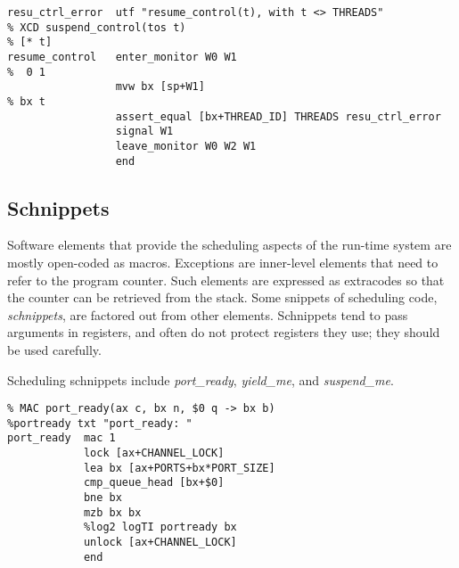 \begin{tabbing}
\indents
{}
\finmore
\end{tabbing}

{\small
\begin{verbatim}
resu_ctrl_error  utf "resume_control(t), with t <> THREADS"
% XCD suspend_control(tos t)                                          % [* t]
resume_control   enter_monitor W0 W1                                  %  0 1
                 mvw bx [sp+W1]                                       % bx t
                 assert_equal [bx+THREAD_ID] THREADS resu_ctrl_error
                 signal W1
                 leave_monitor W0 W2 W1
                 end
\end{verbatim}}

\begin{tabbing}
\indents
\finmon
\end{tabbing}



\subsection{Schnippets}
Software elements that provide the scheduling aspects of the run-time system are mostly open-coded as macros. Exceptions are inner-level elements that need to refer to the program counter. Such elements are expressed as extracodes so that the counter can be retrieved from the stack.
Some snippets of scheduling code, \emph{schnippets}, are factored out from other elements. Schnippets tend to pass arguments in registers, and often do not protect registers they use; they should be used carefully.

Scheduling schnippets include \emph{port\_ready}, \emph{yield\_me},  and \emph{suspend\_me}.

\begin{tabbing}
\indents
{}
\fin
\end{tabbing}

{\small
\begin{verbatim}
% MAC port_ready(ax c, bx n, $0 q -> bx b)
%portready txt "port_ready: "
port_ready  mac 1
            lock [ax+CHANNEL_LOCK]
            lea bx [ax+PORTS+bx*PORT_SIZE]
            cmp_queue_head [bx+$0]
            bne bx
            mzb bx bx
            %log2 logTI portready bx
            unlock [ax+CHANNEL_LOCK]
            end
\end{verbatim}}

